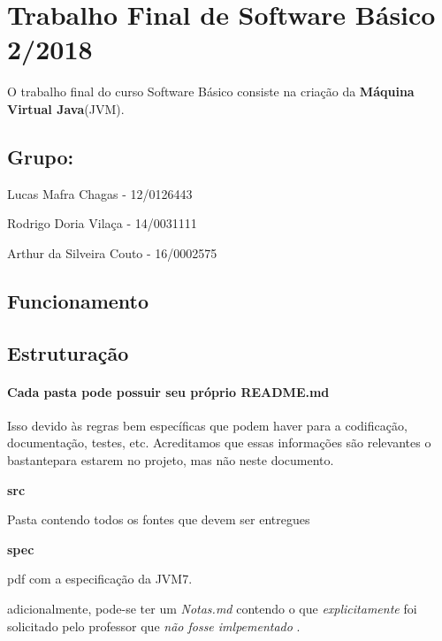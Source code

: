 

\section*{Trabalho Final de Software Básico 2/2018}

O trabalho final do curso Software Básico consiste na criação da {\bfseries Máquina Virtual Java}(J\+VM).

\subsection*{Grupo\+:}

Lucas Mafra Chagas -\/ 12/0126443

Rodrigo Doria Vilaça -\/ 14/0031111

Arthur da Silveira Couto -\/ 16/0002575

\subsection*{Funcionamento}

\subsection*{Estruturação}

\paragraph*{Cada pasta pode possuir seu próprio R\+E\+A\+D\+M\+E.\+md}

Isso devido às regras bem específicas que podem haver para a codificação, documentação, testes, etc. Acreditamos que essas informações são relevantes o bastantepara estarem no projeto, mas não neste documento.


\begin{DoxyItemize}
\item {\bfseries src}
\begin{DoxyItemize}
\item Pasta contendo todos os fontes que devem ser entregues
\end{DoxyItemize}
\item {\bfseries spec}
\begin{DoxyItemize}
\item pdf com a especificação da J\+V\+M7.
\item adicionalmente, pode-\/se ter um {\itshape Notas.\+md} contendo o que {\itshape explicitamente} foi solicitado pelo professor que {\itshape não fosse imlpementado} .
\end{DoxyItemize}
\end{DoxyItemize}

